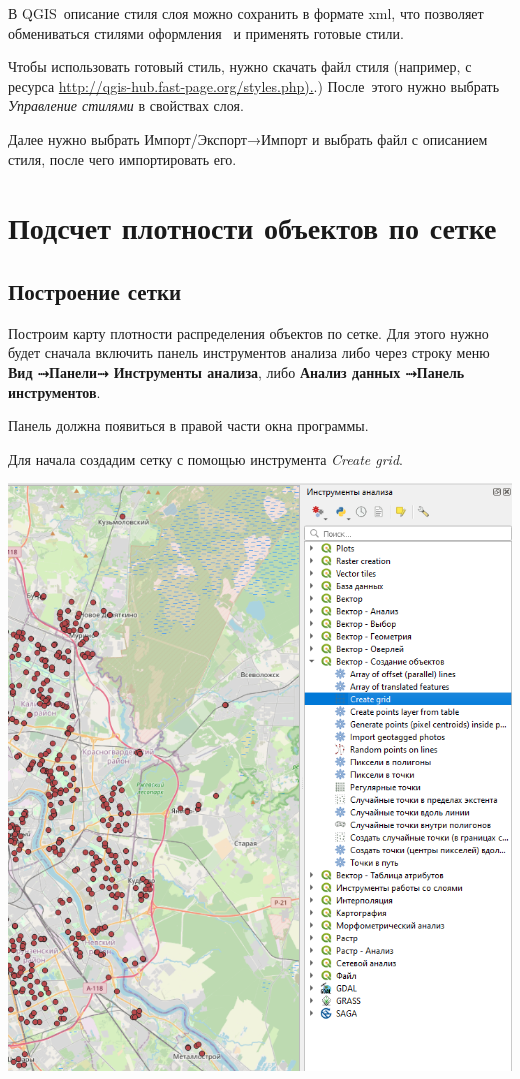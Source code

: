 \documentclass[
]{book}
\begin{document}
В QGIS~описание стиля слоя можно сохранить в формате xml, что позволяет обмениваться стилями оформления ~и применять готовые стили.

Чтобы использовать готовый стиль, нужно скачать файл стиля (например, с ресурса \href{http://qgis-hub.fast-page.org/styles.php}{http://qgis-hub.fast-page.org/styles.php).}.) После~этого нужно выбрать \emph{Управление стилями} в свойствах слоя.

Далее нужно выбрать Импорт/Экспорт→Импорт и выбрать файл с описанием стиля, после чего импортировать его.

\hypertarget{grid}{%
\chapter{Подсчет плотности объектов по сетке}\label{grid}}

\hypertarget{ux43fux43eux441ux442ux440ux43eux435ux43dux438ux435-ux441ux435ux442ux43aux438}{%
\section{Построение сетки}\label{ux43fux43eux441ux442ux440ux43eux435ux43dux438ux435-ux441ux435ux442ux43aux438}}

Построим карту плотности распределения объектов по сетке. Для этого нужно будет сначала включить панель инструментов анализа либо через строку меню \textbf{Вид ⤑Панели⤑ Инструменты анализа}, либо \textbf{Анализ данных ⤑Панель инструментов}.

Панель должна появиться в правой части окна программы.

Для начала создадим сетку с помощью инструмента \emph{Create grid}.

\includegraphics{figures/13.png}
\end{document}
